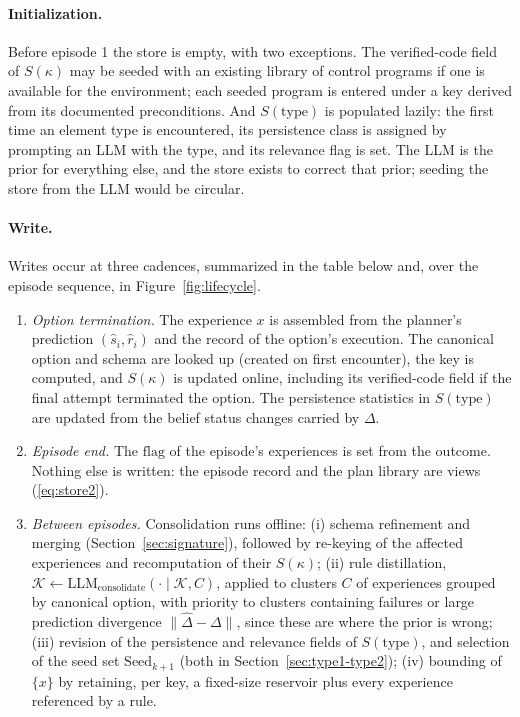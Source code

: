 \documentclass[11pt]{article}
\newcommand{\llm}[1]{\mathrm{LLM}_{\mathrm{#1}}}
\newcommand{\calK}{\mathcal{K}}
\newcommand{\shat}{\hat{s}}
\newcommand{\type}{\mathrm{type}}
\begin{document}
\paragraph{Initialization.}
Before episode 1 the store is empty, with two exceptions. The verified-code field of $S(\kappa)$ may be seeded with an existing library of control programs if one is available for the environment; each seeded program is entered under a key derived from its documented preconditions. And $S(\type)$ is populated lazily: the first time an element type is encountered, its persistence class is assigned by prompting an LLM with the type, and its relevance flag is set. The LLM is the prior for everything else, and the store exists to correct that prior; seeding the store from the LLM would be circular.

\paragraph{Write.}
Writes occur at three cadences, summarized in the table below and, over the episode sequence, in Figure~\ref{fig:lifecycle}.
\begin{enumerate}[leftmargin=1.5em,itemsep=1pt]
\item \emph{Option termination.} The experience $x$ is assembled from the planner's prediction $(\shat_i,\hat r_i)$ and the record of the option's execution. The canonical option and schema are looked up (created on first encounter), the key is computed, and $S(\kappa)$ is updated online, including its verified-code field if the final attempt terminated the option. The persistence statistics in $S(\type)$ are updated from the belief status changes carried by $\Delta$.
\item \emph{Episode end.} The $\mathrm{flag}$ of the episode's experiences is set from the outcome. Nothing else is written: the episode record and the plan library are views (\ref{eq:store2}).
\item \emph{Between episodes.} Consolidation runs offline: (i) schema refinement and merging (Section~\ref{sec:signature}), followed by re-keying of the affected experiences and recomputation of their $S(\kappa)$; (ii) rule distillation, $\calK\leftarrow\llm{consolidate}(\cdot\mid\calK,C)$, applied to clusters $C$ of experiences grouped by canonical option, with priority to clusters containing failures or large prediction divergence $\|\hat\Delta-\Delta\|$, since these are where the prior is wrong; (iii) revision of the persistence and relevance fields of $S(\type)$, and selection of the seed set $\mathrm{Seed}_{k+1}$ (both in Section~\ref{sec:type1-type2}); (iv) bounding of $\{x\}$ by retaining, per key, a fixed-size reservoir plus every experience referenced by a rule.
\end{enumerate}
\end{document}
